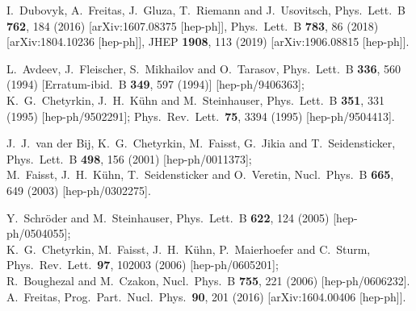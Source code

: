 \documentclass[Physsubmission, Phys]{SciPost}
\begin{document}
\begin{thebibliography}{100}
  I.~Dubovyk, A.~Freitas, J.~Gluza, T.~Riemann and J.~Usovitsch,
  Phys.\ Lett.\ B {\bf 762}, 184 (2016)
  [arXiv:1607.08375 [hep-ph]],
  Phys.\ Lett.\ B {\bf 783}, 86 (2018)
  [arXiv:1804.10236 [hep-ph]],
  JHEP {\bf 1908}, 113 (2019)
  [arXiv:1906.08815 [hep-ph]].

L.~Avdeev, J.~Fleischer, S.~Mikhailov and O.~Tarasov,
Phys.\ Lett.\ B {\bf 336}, 560 (1994)
[Erratum-ibid.\ B {\bf 349}, 597 (1994)]
[hep-ph/9406363];\\
K.~G.~Chetyrkin, J.~H.~K\"uhn and M.~Steinhauser,
Phys.\ Lett.\ B {\bf 351}, 331 (1995)
[hep-ph/9502291];
Phys.\ Rev.\ Lett.\  {\bf 75}, 3394 (1995)
[hep-ph/9504413].

J.~J.~van der Bij, K.~G.~Chetyrkin, M.~Faisst, G.~Jikia and T.~Seidensticker,
Phys.\ Lett.\ B {\bf 498}, 156 (2001)
[hep-ph/0011373];\\
M.~Faisst, J.~H.~K\"uhn, T.~Seidensticker and O.~Veretin,
Nucl.\ Phys.\ B {\bf 665}, 649 (2003)
[hep-ph/0302275].

Y.~Schr\"oder and M.~Steinhauser,
Phys.\ Lett.\ B {\bf 622}, 124 (2005)
[hep-ph/0504055];\\
K.~G.~Chetyrkin, M.~Faisst, J.~H.~K\"uhn, P.~Maierhoefer and C.~Sturm,
  Phys.\ Rev.\ Lett.\  {\bf 97}, 102003 (2006)
  [hep-ph/0605201];\\
  R.~Boughezal and M.~Czakon,
  Nucl.\ Phys.\  B {\bf 755}, 221 (2006)
  [hep-ph/0606232].
  A.~Freitas,
  Prog.\ Part.\ Nucl.\ Phys.\  {\bf 90}, 201 (2016)
  [arXiv:1604.00406 [hep-ph]].


\end{thebibliography}
\end{document}
